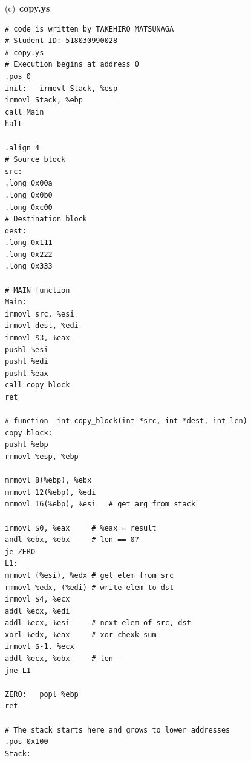 \documentclass{article}
\begin{document}
(c)\ \textbf{copy.ys}
\begin{lstlisting}
# code is written by TAKEHIRO MATSUNAGA
# Student ID: 518030990028
# copy.ys
# Execution begins at address 0 
.pos 0 
init:	irmovl Stack, %esp 
irmovl Stack, %ebp 
call Main
halt

.align 4
# Source block
src:
.long 0x00a
.long 0x0b0
.long 0xc00
# Destination block
dest:
.long 0x111
.long 0x222
.long 0x333

# MAIN function
Main:	
irmovl src, %esi
irmovl dest, %edi
irmovl $3, %eax
pushl %esi
pushl %edi
pushl %eax
call copy_block
ret

# function--int copy_block(int *src, int *dest, int len)
copy_block:
pushl %ebp
rrmovl %esp, %ebp

mrmovl 8(%ebp), %ebx
mrmovl 12(%ebp), %edi
mrmovl 16(%ebp), %esi	# get arg from stack

irmovl $0, %eax		# %eax = result
andl %ebx, %ebx		# len == 0?
je ZERO
L1:	
mrmovl (%esi), %edx	# get elem from src
rmmovl %edx, (%edi)	# write elem to dst
irmovl $4, %ecx
addl %ecx, %edi
addl %ecx, %esi		# next elem of src, dst
xorl %edx, %eax		# xor chexk sum
irmovl $-1, %ecx	
addl %ecx, %ebx		# len --
jne L1

ZERO:	popl %ebp
ret

# The stack starts here and grows to lower addresses
.pos 0x100		
Stack:	 
\end{lstlisting}
\end{document}
